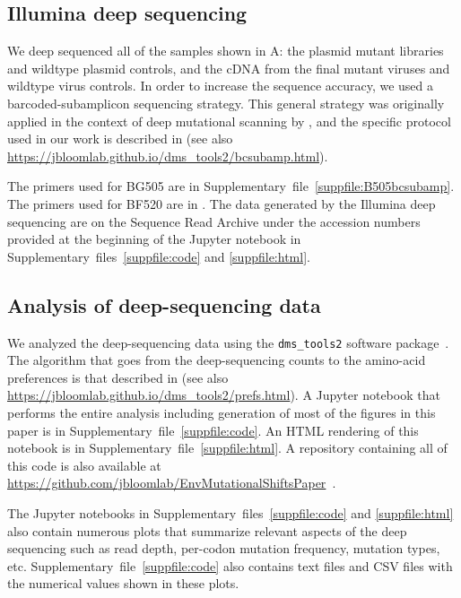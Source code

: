 \documentclass[9pt]{elife}
\begin{document}
\subsection{Illumina deep sequencing}
We deep sequenced all of the samples shown in A: the plasmid mutant libraries and wildtype plasmid controls, and the cDNA from the final mutant viruses and wildtype virus controls.
In order to increase the sequence accuracy, we used a barcoded-subamplicon sequencing strategy.
This general strategy was originally applied in the context of deep mutational scanning by \citet{wu2014high}, and the specific protocol used in our work is described in \citet{doud2016accurate} (see also \url{https://jbloomlab.github.io/dms_tools2/bcsubamp.html}).

The primers used for BG505 are in Supplementary~file~\ref{suppfile:B505bcsubamp}.
The primers used for BF520 are in \citet{dingens2017comprehensive}.
The data generated by the Illumina deep sequencing are on the Sequence Read Archive under the accession numbers provided at the beginning of the Jupyter notebook in Supplementary~files~\ref{suppfile:code} and \ref{suppfile:html}.

\subsection{Analysis of deep-sequencing data}
We analyzed the deep-sequencing data using the \texttt{dms\_tools2} software package~\citep[\url{https://jbloomlab.github.io/dms_tools2/}, version 2.2.4]{bloom2015software}.
The algorithm that goes from the deep-sequencing counts to the amino-acid preferences is that described in \citet{bloom2015software} (see also \url{https://jbloomlab.github.io/dms_tools2/prefs.html}).
A Jupyter notebook that performs the entire analysis including generation of most of the figures in this paper is in Supplementary~file~\ref{suppfile:code}.
An HTML rendering of this notebook is in Supplementary~file~\ref{suppfile:html}.
A repository containing all of this code is also available at \url{https://github.com/jbloomlab/EnvMutationalShiftsPaper}~\citep[][copy archived at \url{https://github.com/elifesciences-publications/EnvMutationalShiftsPaper}]{haddox2018github}.

The Jupyter notebooks in Supplementary~files~\ref{suppfile:code} and \ref{suppfile:html} also contain numerous plots that summarize relevant aspects of the deep sequencing such as read depth, per-codon mutation frequency, mutation types, etc.
Supplementary~file~\ref{suppfile:code} also contains text files and CSV files with the numerical values shown in these plots.
\end{document}
